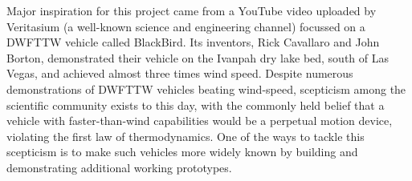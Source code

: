 Major inspiration for this project came from a YouTube video uploaded by Veritasium (a well-known science and engineering channel) focussed on a DWFTTW vehicle called BlackBird. Its inventors, Rick Cavallaro and John Borton, demonstrated their vehicle on the Ivanpah dry lake bed, south of Las Vegas, and achieved almost three times wind speed. Despite numerous demonstrations of DWFTTW vehicles beating wind-speed, scepticism among the scientific community exists to this day, with the commonly held belief that a vehicle with faster-than-wind capabilities would be a perpetual motion device, violating the first law of thermodynamics. One of the ways to tackle this scepticism is to make such vehicles more widely known by building and demonstrating additional working prototypes.